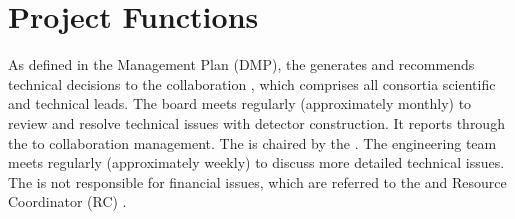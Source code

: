 \chapter{Project Functions}
\label{vl:tc-project}

As defined in the  Management Plan (DMP), the 
 generates and recommends technical decisions to the
 collaboration , which
comprises all consortia scientific and technical leads. The board meets
regularly (approximately monthly) to review and resolve
technical issues with detector construction. It reports
through the  to collaboration management. The  
is chaired by the  . The
  engineering team meets regularly (approximately weekly)
to discuss more detailed technical issues. The  is not responsible for financial issues, which are referred to
the  and Resource Coordinator (RC)  .

